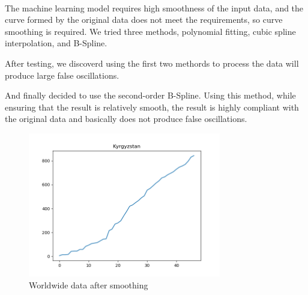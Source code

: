 \documentclass[]{article}
\begin{document}
\paragraph{}
The machine learning model requires high smoothness of the input data, 
and the curve formed by the original data does not meet the requirements, 
so curve smoothing is required.
We tried three methods, polynomial fitting, cubic spline interpolation,
and B-Spline.
\par
After testing, we discoverd using the first two methords to process
the data will produce large false oscillations.
\begin{figure}[H]
    \centering
\end{figure}
\par
And finally decided to use the second-order B-Spline.
Using this method, 
while ensuring that the result is relatively smooth, 
the result is highly compliant with the original data 
and basically does not produce false oscillations.
\begin{figure}[H]
    \centering
    \includegraphics[width = 0.75\textwidth]{Worldwide.png}
    \caption{Worldwide data after smoothing}
\end{figure}
\end{document}
